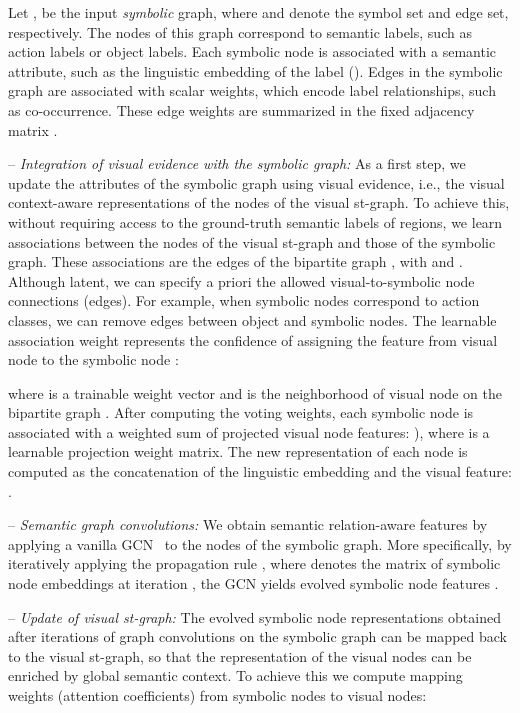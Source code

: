 \documentclass[runningheads]{llncs}
\newcommand{\mysubparagraph}[1]{\smallskip\noindent-- \emph{#1:}}
\begin{document}
Let  , be the input \emph{symbolic} graph, where  and 
 denote the symbol set and edge set, respectively. The nodes of this 
graph correspond to semantic labels, such as action labels or object labels. 
Each symbolic node  is associated with a semantic attribute, such as the 
linguistic embedding of the label (). Edges in the symbolic graph are associated with scalar weights, which encode label relationships, such as co-occurrence. 
These edge weights are summarized in the fixed 
adjacency matrix .

\mysubparagraph{Integration of visual evidence with the symbolic graph}
As a first step, we update the attributes of the symbolic graph using visual evidence, 
i.e., the visual context-aware representations of the nodes of the visual st-graph.
To achieve this, without requiring access to the ground-truth semantic labels of regions, we learn 
associations between the nodes of the visual st-graph and those of the symbolic graph.
These associations are the edges of the bipartite graph , with  and . Although latent, we can specify a priori the allowed visual-to-symbolic node connections (edges). For example, when symbolic nodes correspond to action classes, we can remove edges between object and symbolic nodes.
The learnable association weight  represents the confidence of assigning the feature from visual node  to the symbolic node :

where  is a 
trainable weight vector and  is the neighborhood of visual node  on the bipartite graph .
After computing the voting weights, each symbolic node is associated with a weighted sum of projected visual node features:
),
where  is a learnable projection weight matrix.  
The new representation of each node  is computed as the 
concatenation of the linguistic embedding and the visual feature: .

\mysubparagraph{Semantic graph convolutions} We obtain semantic relation-aware features by applying a vanilla GCN~\cite{Kipf:ICLR17} to the nodes of the symbolic graph. More specifically, by iteratively applying the propagation rule , where  denotes the matrix of symbolic node embeddings at iteration , the GCN yields evolved symbolic node features .

\mysubparagraph{Update of visual st-graph} 
The evolved symbolic node representations obtained after  iterations of 
graph convolutions on the symbolic graph can be mapped back to the visual st-graph, so that the representation of the visual nodes can be enriched by global semantic context. To achieve this we compute mapping weights (attention coefficients) from symbolic nodes to visual nodes:
\end{document}

